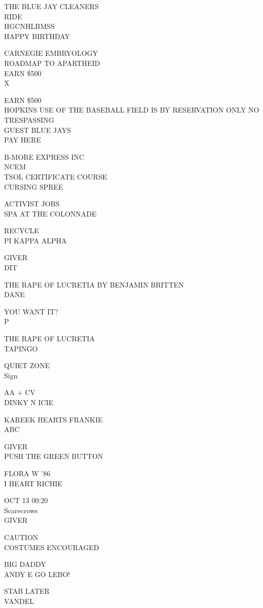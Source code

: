 \documentclass[10pt,letterpaper]{article}
\begin{document}
THE BLUE JAY CLEANERS\\
RIDE\\
HGCNHLBMSS\\
HAPPY BIRTHDAY

CARNEGIE EMBRYOLOGY\\
ROADMAP TO APARTHEID\\
EARN \$500\\
X

EARN \$500\\
HOPKINS USE OF THE BASEBALL FIELD IS BY RESERVATION ONLY NO TRESPASSING\\
GUEST BLUE JAYS\\
PAY HERE

B{-}MORE EXPRESS INC\\
NCEM\\
TSOL CERTIFICATE COURSE\\
CURSING SPREE

ACTIVIST JOBS\\
SPA AT THE COLONNADE

RECYCLE\\
PI KAPPA ALPHA

GIVER\\
DIT

THE RAPE OF LUCRETIA BY BENJAMIN BRITTEN\\
DANE

YOU WANT IT?\\
P

THE RAPE OF LUCRETIA\\
TAPINGO

QUIET ZONE\\
Sign

AA + CV\\
DINKY N ICIE

KAREEK HEARTS FRANKIE\\
ABC

GIVER\\
PUSH THE GREEN BUTTON

FLORA W '86\\
I HEART RICHIE

OCT 13 00:20\\
Scarecrows\\
GIVER

CAUTION\\
COSTUMES ENCOURAGED

BIG DADDY\\
ANDY E GO LEBO!

STAB LATER\\
VANDEL
\end{document}
